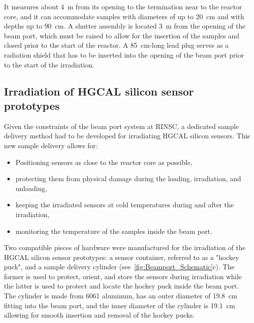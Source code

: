 It measures about \SI{4}{\metre} from its opening to the termination near to the reactor core, and it can accommodate samples with diameters of up to \SI{20}{\centi\metre} and with depths up to \SI{90}{\centi\metre}.
A shutter assembly is located \SI{3}{\metre} from the opening of the beam port, which must be raised to allow for the insertion of the samples and closed prior to the start of the reactor.
A \SI{85}{\centi\metre}-long lead plug serves as a radiation shield that has to be inserted into the opening of the beam port prior to the start of the irradiation.

\subsection{Irradiation of HGCAL silicon sensor prototypes}
\label{subsec:irradiation}
Given the constraints of the beam port system at RINSC, a dedicated sample delivery method had to be developed for irradiating HGCAL silicon sensors.
This new sample delivery allows for:
\begin{itemize}
  \item Positioning sensors as close to the reactor core as possible,
  \item protecting them from physical damage during the loading, irradiation, and unloading,
  \item keeping the irradiated sensors at cold temperatures during and after the irradiation,
  \item monitoring the temperature of the samples inside the beam port.
\end{itemize}
Two compatible pieces of hardware were manufactured for the irradiation of the HGCAL silicon sensor prototypes: a sensor container, referred to as a "hockey puck", and a sample delivery cylinder (see~\ref{fig:Beamport_Schematic}c). 
The former is used to protect, orient, and store the sensors during irradiation while the latter is used to protect and locate the hockey puck inside the beam port.
The cylinder is made from 6061 aluminum, has an outer diameter of \SI{19.8}{\centi\metre} fitting into the beam port, and the inner diameter of the cylinder is \SI{19.1}{\centi\metre} allowing for smooth insertion and removal of the hockey pucks.
